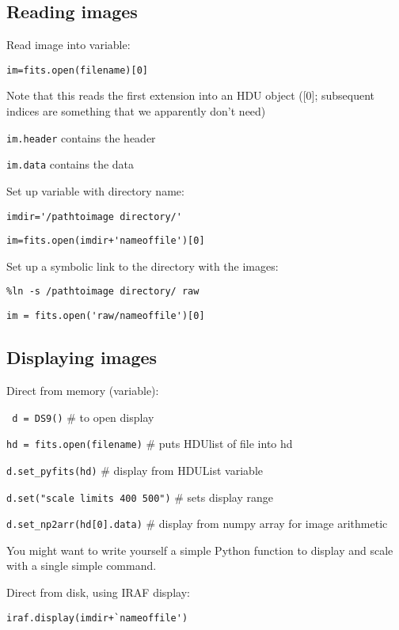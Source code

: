 \documentclass{article}
\begin{document}
\subsection*{Reading images}
Read image into variable:
\begin{itemize*}
    \item \verb|im=fits.open(filename)[0]|
\end{itemize*}
Note that this reads the first extension into an HDU object
([0]; subsequent indices are something that we apparently don't need)
\begin{itemize*}
    \item \verb|im.header| contains the header
    \item \verb|im.data| contains the data
\end{itemize*}
Set up variable with directory name:
\begin{itemize*}
    \item \verb|imdir='/pathtoimage directory/'|
    \item \verb|im=fits.open(imdir+'nameoffile')[0]|
\end{itemize*}
Set up a symbolic link to the directory with the images:
\begin{itemize*}
    \item \verb|%ln -s /pathtoimage directory/ raw|
    \item \verb|im = fits.open('raw/nameoffile')[0]|
\end{itemize*}

\subsection*{Displaying images}
Direct from memory (variable):
\begin{itemize*}
    \item \verb| d = DS9()| \# to open display
    \item \verb|hd = fits.open(filename)| \# puts HDUlist of file into hd
    \item \verb|d.set_pyfits(hd)| \# display from HDUList variable
    \item \verb|d.set("scale limits 400 500")| \# sets display range
    \item \verb|d.set_np2arr(hd[0].data)| \# display from numpy array
        for image arithmetic
\end{itemize*}
You might want to write yourself a simple Python function to display
and scale with a single simple command.

Direct from disk, using IRAF display:
\begin{itemize*}
    \item \verb|iraf.display(imdir+`nameoffile')|
\end{itemize*}
\end{document}

